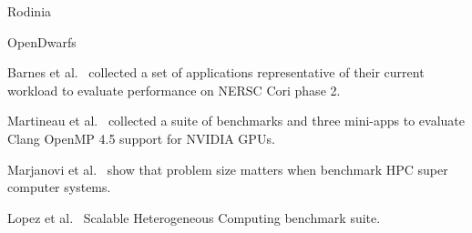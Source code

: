 \documentclass[../document.tex]{subfiles}
\begin{document}
\label{sec:related_work}

Rodinia

OpenDwarfs

Barnes et al.~\cite{barnes2016evaluating} collected a set of applications representative of their current workload to evaluate performance on NERSC Cori phase 2.

Martineau et al.~\cite{martineau2016performance} collected a suite of benchmarks and three mini-apps to evaluate Clang OpenMP 4.5 support for NVIDIA GPUs.

Marjanovi et al.~\cite{marjanovic2016hpc} show that problem size matters when benchmark HPC super computer systems.

Lopez et al.~\cite{lopez2015examining} Scalable Heterogeneous Computing benchmark suite.
\end{document}
